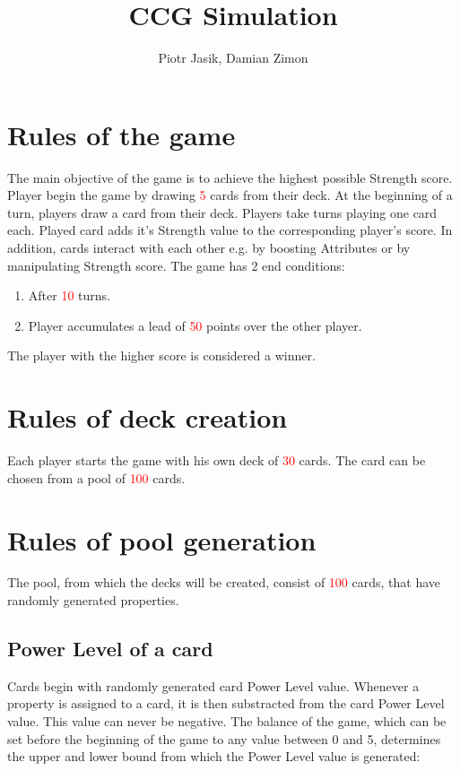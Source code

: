 \documentclass{article}
\title{CCG Simulation}
\author{Piotr Jasik, Damian Zimon}
\begin{document}
\maketitle

\section{Rules of the game}
    The main objective of the game is to achieve the highest possible Strength score. 
    Player begin the game by drawing \textcolor{red}{5} cards from their deck.
    At the beginning of a turn, players draw a card from their deck.
    Players take turns playing one card each.
    Played card adds it's Strength value to the corresponding player's score. 
    In addition, cards interact with each other e.g. by boosting Attributes or by manipulating Strength score. 
    The game has 2 end conditions: 
    
    \begin{enumerate}
        \item After \textcolor{red}{10} turns.
        \item Player accumulates a lead of \textcolor{red}{50} points over the other player.
    \end{enumerate}
    
    The player with the higher score is considered a winner.

\section{Rules of deck creation}
    
    Each player starts the game with his own deck of \textcolor{red}{30} cards. 
    The card can be chosen from a pool of \textcolor{red}{100} cards.

\section{Rules of pool generation}
    
    The pool, from which the decks will be created, consist of \textcolor{red}{100} cards, 
    that have randomly generated properties.

\subsection{Power Level of a card}
    
    Cards begin with randomly generated card Power Level value.  Whenever a property 
    is assigned to a card, it is then substracted from the card Power Level value. 
    This value can never be negative. The balance of the game, which can be set before 
    the beginning of the game to any value between 0 and 5, determines the upper and lower bound from which the Power Level value is generated:
    
\end{document}
